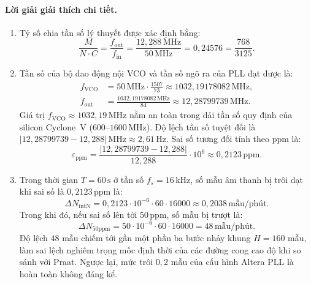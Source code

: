\paragraph{Lời giải giải thích chi tiết.}
\begin{enumerate}[label=\alph*)]
    \item Tỷ số chia tần số lý thuyết được xác định bằng:
    \[
    \frac{M}{N\cdot C} = \frac{f_{\mathrm{out}}}{f_{\mathrm{in}}} = \frac{12{,}288\,\text{MHz}}{50\,\text{MHz}} = 0{,}24576 = \frac{768}{3125}.
    \]
    \item Tần số của bộ dao động nội VCO và tần số ngõ ra của PLL đạt được là:
    \begin{align*}
    f_{\mathrm{VCO}} &= 50\,\text{MHz}\cdot\frac{1507}{73} \approx 1032{,}19178082\,\text{MHz},\\
    f_{\mathrm{out}} &= \frac{1032{,}19178082\,\text{MHz}}{84} \approx 12{,}28799739\,\text{MHz}.
    \end{align*}
    Giá trị $f_{\mathrm{VCO}} \approx 1032{,}19\,\text{MHz}$ nằm an toàn trong dải tần số quy định của silicon Cyclone~V ($600\text{--}1600\,\text{MHz}$). Độ lệch tần số tuyệt đối là $|12{,}28799739 - 12{,}288|\,\text{MHz} \approx 2{,}61\,\text{Hz}$. Sai số tương đối tính theo ppm là:
    \[
    \varepsilon_{\mathrm{ppm}} = \frac{|12{,}28799739 - 12{,}288|}{12{,}288}\cdot 10^6 \approx 0{,}2123\,\text{ppm}.
    \]
    \item Trong thời gian $T = 60\,\text{s}$ ở tần số $f_s = 16\,\text{kHz}$, số mẫu âm thanh bị trôi dạt khi sai số là $0{,}2123\,\text{ppm}$ là:
    \[
    \Delta N_{\mathrm{intN}} = 0{,}2123\cdot 10^{-6}\cdot 60\cdot 16000 \approx 0{,}2038\,\text{mẫu/phút}.
    \]
    Trong khi đó, nếu sai số lên tới $50\,\text{ppm}$, số mẫu bị trượt là:
    \[
    \Delta N_{50\mathrm{ppm}} = 50\cdot 10^{-6}\cdot 60\cdot 16000 = 48\,\text{mẫu/phút}.
    \]
    Độ lệch $48$ mẫu chiếm tới gần một phần ba bước nhảy khung $H = 160$ mẫu, làm sai lệch nghiêm trọng mốc định thời của các đường cong cao độ khi so sánh với Praat. Ngược lại, mức trôi $0{,}2$ mẫu của cấu hình Altera PLL là hoàn toàn không đáng kể.
\end{enumerate}

